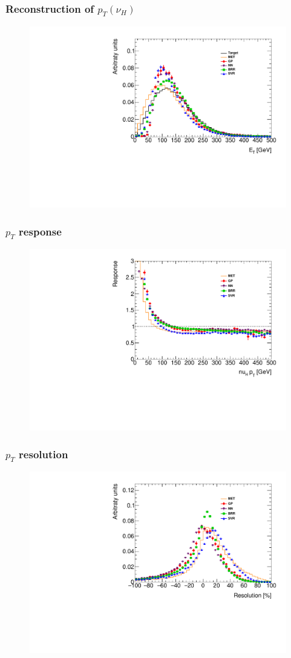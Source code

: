 \documentclass[9pt, lualatex]{beamer}
\begin{document}
\begin{frame}
    \frametitle{Reconstruction of $p_{T}(\nu_H)$}

    \begin{figure}
        \centering
        \includegraphics[width=.7\textwidth]{plots/pt.pdf}
    \end{figure}
\end{frame}

\begin{frame}
    \frametitle{$p_{T}$ response}

    \begin{figure}
        \centering
        \includegraphics[width=.7\textwidth]{plots/profile.pdf}
    \end{figure}
\end{frame}

\begin{frame}
    \frametitle{$p_{T}$ resolution}

    \begin{figure}
        \centering
        \includegraphics[width=.7\textwidth]{plots/resolution.pdf}
    \end{figure}
\end{frame}
\end{document}
